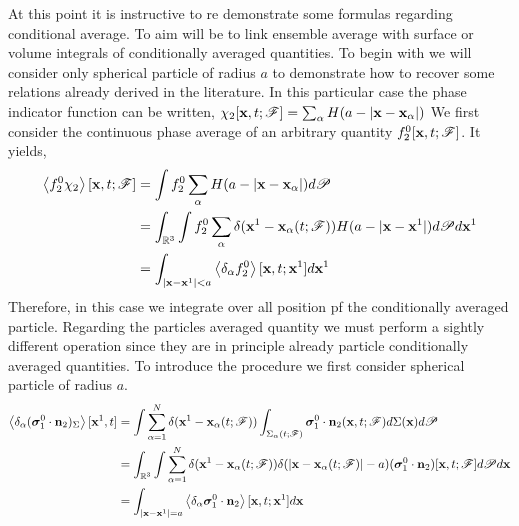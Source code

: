 At this point it is instructive to re demonstrate some formulas regarding conditional average. 
To aim will be to link ensemble average with surface or volume integrals of conditionally averaged quantities. 
To begin with we will consider only spherical particle of radius $a$ to demonstrate how to recover some relations already derived in the literature. 
In this particular case the phase indicator function can be written, $\chi_2[\textbf{x},t;\mathscr{F}] = \sum_\alpha H(a - |\textbf{x} - \textbf{x}_\alpha|)$
We first consider the continuous phase average of an arbitrary quantity $f_2^0[\textbf{x},t;\mathscr{F}]$. 
It yields, 
\begin{align}
    \left<f_2^0 \chi_2\right>[\textbf{x},t;\mathscr{F}]
    &= \int f_2^0 \sum_\alpha  H(a - |\textbf{x} - \textbf{x}_\alpha|) d\mathscr{P}\\
    &= \int _{\mathbb{R}^3} \int f_2^0 \sum_\alpha  \delta(\textbf{x}^1 - \textbf{x}_\alpha(t;\mathscr{F})) H(a - |\textbf{x} - \textbf{x}^1|) d\mathscr{P} d\textbf{x}^1\\
    &= \int _{|\textbf{x} - \textbf{x}^1| < a} \left< \delta_\alpha f_2^0\right>[\textbf{x},t;\textbf{x}^1] d\textbf{x}^1
\end{align} 
Therefore, in this case we integrate over all position pf the conditionally averaged particle. 
Regarding the particles averaged quantity we must perform a sightly different operation since they are in principle already particle conditionally averaged quantities.
To introduce the procedure we first consider spherical particle of radius $a$. 
\begin{align}
    \left<\delta_\alpha ( \bm\sigma_1^0\cdot\textbf{n}_2 )_{\Sigma}\right>[\textbf{x}^1,t]
    &= \int \sum_{\alpha=1}^N \delta(\textbf{x}^1-\textbf{x}_\alpha(t; \mathscr{F}))
    \int_{\Sigma_\alpha(t; \mathscr{F})}
    \bm\sigma_1^0\cdot\textbf{n}_2(\textbf{x},t;\mathscr{F})
    d\Sigma(\textbf{x}) d\mathscr{P}\\
    &= 
    \int_{\mathbb{R}^3}
    \int
     \sum_{\alpha=1}^N \delta(\textbf{x}^1-\textbf{x}_\alpha(t; \mathscr{F}))
    \delta(|\textbf{x} - \textbf{x}_{\alpha}(t;\mathscr{F})|-a)
    (\bm\sigma_1^0\cdot\textbf{n}_2)[\textbf{x},t;\mathscr{F}]
    d\mathscr{P}
    d\textbf{x}\\
    &=
    \int_{|\textbf{x}-\textbf{x}^1|=a}
    \left<\delta_\alpha  \bm\sigma_1^0\cdot \textbf{n}_2\right>
    [\textbf{x},t;\textbf{x}^1]
    d\textbf{x}
    \label{eq:conditional_sphere}
\end{align}
